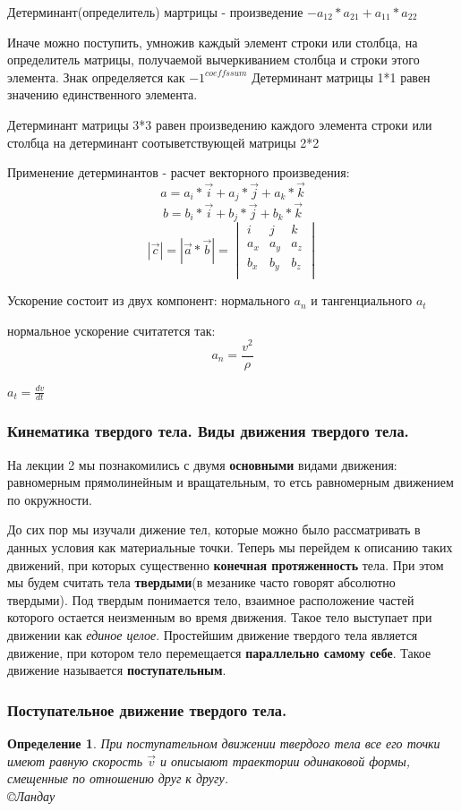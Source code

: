 \documentclass{article}
\newtheorem{theorem}{Определение} %
\begin{document}
Детерминант(определитель) мартрицы - произведение $-a_{12}*a_{21}+a_{11}*a_{22}$

Иначе можно поступить, умножив каждый элемент строки или столбца, на определитель матрицы, получаемой вычеркиванием столбца и строки этого элемента. Знак определяется как $-1^{coeffs sum}$ Детерминант матрицы 1*1 равен значению единственного элемента.

Детерминант матрицы 3*3 равен произведению каждого элемента строки или столбца на детерминант соотыветствующей матрицы 2*2 

Применение детерминантов - расчет векторного произведения:
$$
a = a_i*\vec{i} +  a_j*\vec{j} +  a_k*\vec{k}
$$$$
b = b_i*\vec{i} +  b_j*\vec{j} +  b_k*\vec{k}
$$$$
|\vec{c}|=|\vec{a}*\vec{b}| = \begin{vmatrix}
	i & j & k\\
	a_x & a_y & a_z\\
	b_x& b_y & b_z\\
\end{vmatrix}
$$

Ускорение состоит из двух компонент: нормального $a_n$ и тангенциального $a_t$

нормальное ускорение считатется так: $$a_n = \frac{v^2}{\rho}$$

$a_t = \frac{dv}{dt}$

\subsubsection{Кинематика твердого тела. Виды движения твердого тела.}
На лекции 2 мы познакомились с двумя \textbf{основными} видами движения: равномерным прямолинейным и вращательным, то етсь равномерным движением по окружности.

До сих пор мы изучали дижение тел, которые можно было рассматривать в данных условия как материальные точки. Теперь мы перейдем к описанию таких движений, при которых существенно \textbf{конечная протяженность} тела. При этом мы будем считать тела \textbf{твердыми}(в мезанике часто говорят абсолютно твердыми). Под твердым понимается тело, взаимное расположение частей которого остается неизменным во время движения. Такое тело выступает при движении как \emph{единое целое}. Простейшим движение твердого тела является движение, при котором тело перемещается \textbf{параллельно самому себе}. Такое движение называется\textbf{ поступательным}.
\subsubsection{ Поступательное движение твердого тела.}
\begin{theorem}
При поступательном движении твердого тела \emph{все его точки имеют равную скорость $\vec{v}$} и описыают траектории одинаковой формы, смещенные по отношению друг к другу.
\\ 
\copyright{Ландау}
\end{theorem}
\end{document}
